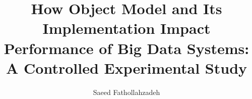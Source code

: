 \begin{frontmatter}

    \title{How Object Model and Its Implementation Impact Performance of Big Data Systems: A Controlled Experimental Study}
    
    \author[1]{Saeed Fathollahzadeh}%
    
    
\end{frontmatter}
